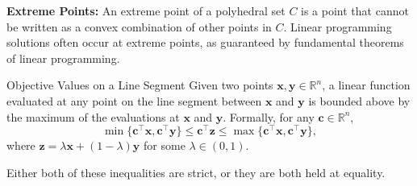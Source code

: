 \textbf{Extreme Points:}  
An extreme point of a polyhedral set \(C\) is a point that cannot be written as a convex combination of other points in \(C\). Linear programming solutions often occur at extreme points, as guaranteed by fundamental theorems of linear programming.

\begin{lemma}{Objective Values on a Line Segment}
\label{lemma:objective_bound}
Given two points \(\mathbf{x}, \mathbf{y} \in \mathbb{R}^n\), a linear function evaluated at any point on the line segment between \(\mathbf{x}\) and \(\mathbf{y}\) is bounded above by the maximum of the evaluations at \(\mathbf{x}\) and \(\mathbf{y}\). Formally, for any \(\mathbf{c} \in \mathbb{R}^n\),
\[
\min\{\mathbf{c}^\top \mathbf{x}, \mathbf{c}^\top \mathbf{y}\} \leq \mathbf{c}^\top \mathbf{z} \leq \max\{\mathbf{c}^\top \mathbf{x}, \mathbf{c}^\top \mathbf{y}\},
\]
where \(\mathbf{z} = \lambda \mathbf{x} + (1-\lambda) \mathbf{y}\) for some $\lambda \in (0,1)$.

Either both of these inequalities are strict, or they are both held at equality.
\end{lemma}

